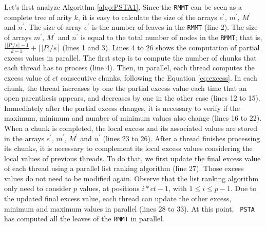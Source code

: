 Let's first analyze Algorithm \ref{algo:PSTA1}. Since the {\tt RMMT}
can be seen as a complete tree of arity $k$, it is easy to calculate
the size of the arrays $e^{\prime}$, $m^{\prime}$, $M^{\prime}$ and
$n^{\prime}$. The size of array $e^{\prime}$ is the number of leaves
in the {\tt RMMT} (line 2). The size of arrays $m^{\prime}$,
$M^{\prime}$ and $n^{\prime}$ is equal to the total number of nodes in
the {\tt RMMT}; that is, $\frac{\lceil |P|/s \rceil-1}{k-1} + \lceil
|P|/s \rceil$ (lines 1 and 3). Lines 4 to 26 shows the computation of
partial excess values in parallel. The first step is to compute the
number of chunks that each thread has to process (line 4). Then, in
parallel, each thread computes the excess value of $ct$ consecutive
chunks, following the Equation \ref{eq:excess}. In each chunk, the
thread increases by one the partial excess value each time that an
open parenthesis appears, and decreases by one in the other case
(lines 12 to 15). Immediately after the partial excess changes, it is
necessary to verify if the maximum, minimum and number of minimum
values also change (lines 16 to 22). When a chunk is completed, the
local excess and its associated values are stored in the arrays
$e^{\prime}$, $m^{\prime}$, $M^{\prime}$ and $n^{\prime}$ (lines 23 to
26). After a thread finishes processing its chunks, it is necessary to
complement its local excess values considering the local values of
previous threads. To do that, we first update the final excess value
of each thread using a parallel list ranking algorithm (line 27). 
Those excess values do not need to be modified again. Observe that
the list ranking algorithm only need to consider $p$ values, at positions
$i*ct-1$, with $1\leq i \leq p-1$. Due to the updated final excess value,
each thread can update the other excess, minimum and maximum values in
parallel (lines 28 to 33). At this point, {\tt
  PSTA} has computed all the leaves of the {\tt RMMT} in parallel.

